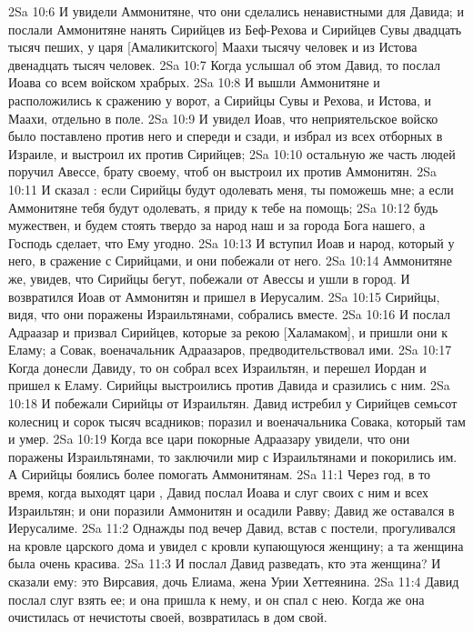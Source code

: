 \vs 2Sa 10:6 И увидели Аммонитяне, что они сделались ненавистными для Давида; и послали Аммонитяне нанять Сирийцев из Беф-Рехова и Сирийцев Сувы двадцать тысяч пеших, у царя [Амаликитского] Маахи тысячу человек и из Истова двенадцать тысяч человек.
\vs 2Sa 10:7 Когда услышал об этом Давид, то послал Иоава со всем войском храбрых.
\vs 2Sa 10:8 И вышли Аммонитяне и расположились к сражению у ворот, а Сирийцы Сувы и Рехова, и Истова, и Маахи,  отдельно в поле.
\vs 2Sa 10:9 И увидел Иоав, что неприятельское войско было поставлено против него и спереди и сзади, и избрал  из всех отборных в Израиле, и выстроил их против Сирийцев;
\vs 2Sa 10:10 остальную же часть людей поручил Авессе, брату своему, чтоб он выстроил их против Аммонитян.
\vs 2Sa 10:11 И сказал : если Сирийцы будут одолевать меня, ты поможешь мне; а если Аммонитяне тебя будут одолевать, я приду к тебе на помощь;
\vs 2Sa 10:12 будь мужествен, и будем стоять твердо за народ наш и за города Бога нашего, а Господь сделает, что Ему угодно.
\vs 2Sa 10:13 И вступил Иоав и народ, который  у него, в сражение с Сирийцами, и они побежали от него.
\vs 2Sa 10:14 Аммонитяне же, увидев, что Сирийцы бегут, побежали от Авессы и ушли в город. И возвратился Иоав от Аммонитян и пришел в Иерусалим.
\vs 2Sa 10:15 Сирийцы, видя, что они поражены Израильтянами, собрались вместе.
\vs 2Sa 10:16 И послал Адраазар и призвал Сирийцев, которые за рекою [Халамаком], и пришли они к Еламу; а Совак, военачальник Адраазаров, предводительствовал ими.
\vs 2Sa 10:17 Когда донесли  Давиду, то он собрал всех Израильтян, и перешел Иордан и пришел к Еламу. Сирийцы выстроились против Давида и сразились с ним.
\vs 2Sa 10:18 И побежали Сирийцы от Израильтян. Давид истребил у Сирийцев семьсот колесниц и сорок тысяч всадников; поразил и военачальника Совака, который там и умер.
\vs 2Sa 10:19 Когда все цари покорные Адраазару увидели, что они поражены Израильтянами, то заключили мир с Израильтянами и покорились им. А Сирийцы боялись более помогать Аммонитянам.
\vs 2Sa 11:1 Через год, в то время, когда выходят цари , Давид послал Иоава и слуг своих с ним и всех Израильтян; и они поразили Аммонитян и осадили Равву; Давид же оставался в Иерусалиме.
\rsbpar\vs 2Sa 11:2 Однажды под вечер Давид, встав с постели, прогуливался на кровле царского дома и увидел с кровли купающуюся женщину; а та женщина была очень красива.
\vs 2Sa 11:3 И послал Давид разведать, кто эта женщина? И сказали ему: это Вирсавия, дочь Елиама, жена Урии Хеттеянина.
\vs 2Sa 11:4 Давид послал слуг взять ее; и она пришла к нему, и он спал с нею. Когда же она очистилась от нечистоты своей, возвратилась в дом свой.
